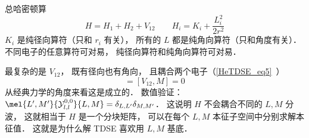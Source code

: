 
总哈密顿算
\begin{equation}
H = H_1 + H_2 + V_{12} \qquad H_i = K_i + \frac{L_i^2}{2r^2}
\end{equation}
$K_i$ 是纯径向算符（只和 $r_i$ 有关）， 所有的 $L$ 都是纯角向算符（只和角度有关）． 不同电子的任意算符可对易， 纯径向算符和纯角向算符可对易．

最复杂的是 $V_{12}$， 既有径向也有角向， 且耦合两个电子（\autoref{HeTDSE_eq5}~）
\begin{equation}
[V_{12}, L^2] = [V_{12}, M] = 0
\end{equation}
从经典力学的角度来看这是成立的． 数值验证： $\mel{L',M'}{\mathcal Y_{l,l}^{0,0}}{L,M} = \delta_{L,L'}\delta_{M,M'}$． 这说明 $H$ 不会耦合不同的 $L,M$ 分波， 这就相当于 $H$ 是一个分块矩阵， 可以在每个 $L,M$ 本征子空间中分别求解本征值． 这就是为什么解 TDSE 喜欢用 $L,M$ 基底．
